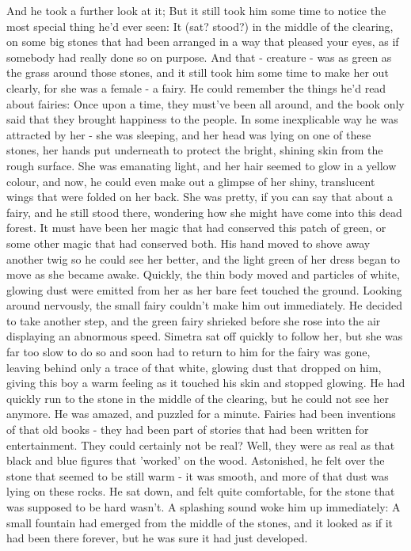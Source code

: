And he took a further look at it; But it still took him some time to notice the most special thing he'd ever seen: It (sat? stood?) in the middle of the clearing, on some big stones that had been arranged in a way that pleased your eyes, as if somebody had really done so on purpose. 
And that - creature - was as green as the grass around those stones, and it still took him some time to make her out clearly, for she was a female - a fairy. He could remember the things he'd read about fairies: Once upon a time, they must've been all around, and the book only said that they brought happiness to the people. 
In some inexplicable way he was attracted by her - she was sleeping, and her head was lying on one of these stones, her hands put underneath to protect the bright, shining skin from the rough surface. She was emanating light, and her hair seemed to glow in a yellow colour, and now, he could even make out a glimpse of her shiny, translucent wings that were folded on her back. 
She was pretty, if you can say that about a fairy, and he still stood there, wondering how she might have come into this dead forest. It must have been her magic that had conserved this patch of green, or some other magic that had conserved both. 
His hand moved to shove away another twig so he could see her better, and the light green of her dress began to move as she became awake. 
Quickly, the thin body moved and particles of white, glowing dust were emitted from her as her bare feet touched the ground. Looking around nervously, the small fairy couldn't make him out immediately. He decided to take another step, and the green fairy shrieked before she rose into the air displaying an abnormous speed. Simetra sat off quickly to follow her, but she was far too slow to do so and soon had to return to him for the fairy was gone, leaving behind only a trace of that white, glowing dust that dropped on him, giving this boy a warm feeling as it touched his skin and stopped glowing. He had quickly run to the stone in the middle of the clearing, but he could not see her anymore. 
He was amazed, and puzzled for a minute. Fairies had been inventions of that old books - they had been part of stories that had been written for entertainment. They could certainly not be real? Well, they were as real as that black and blue figures that 'worked' on the wood. 
Astonished, he felt over the stone that seemed to be still warm - it was smooth, and more of that dust was lying on these rocks. He sat down, and felt quite comfortable, for the stone that was supposed to be hard wasn't. 
A splashing sound woke him up immediately: A small fountain had emerged from the middle of the stones, and it looked as if it had been there forever, but he was sure it had just developed. 
